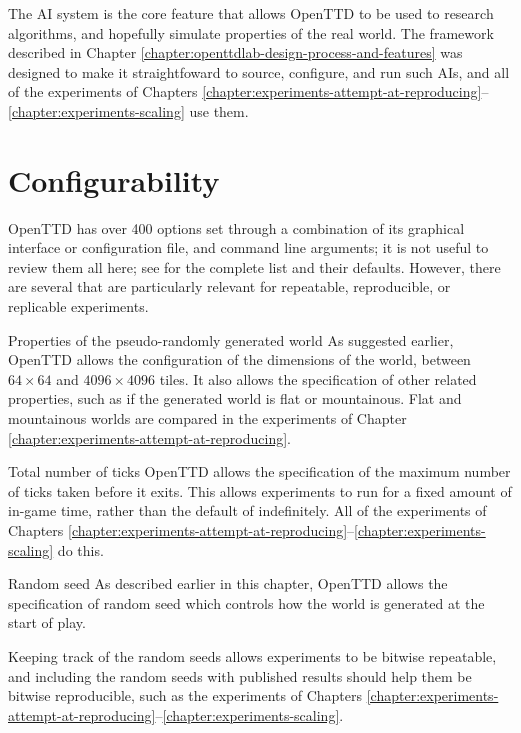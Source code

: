 \documentclass[logo,msc,dsti]{style/infthesis}    %
\begin{document}
{The AI system is the core feature that allows OpenTTD to be used to research algorithms, and hopefully simulate properties of the real world. The framework described in Chapter \ref{chapter:openttdlab-design-process-and-features} was designed to make it straightfoward to source, configure, and run such AIs, and all of the experiments of Chapters \ref{chapter:experiments-attempt-at-reproducing}--\ref{chapter:experiments-scaling} use them.

\section{Configurability}

OpenTTD has over 400 options set through a combination of its graphical interface or configuration file, and command line arguments; it is not useful to review them all here; see \cite{OpenTTDWiki} for the complete list and their defaults. However, there are several that are particularly relevant for repeatable, reproducible, or replicable experiments.

\begin{itemize}
\begin{descitem}{Properties of the pseudo-randomly generated world}
As suggested earlier, OpenTTD allows the configuration of the dimensions of the world, between $64 \times 64$ and $4096 \times 4096$ tiles. It also allows the specification of other related properties, such as if the generated world is flat or mountainous. Flat and mountainous worlds are compared in the experiments of Chapter \ref{chapter:experiments-attempt-at-reproducing}.
\end{descitem}
\begin{descitem}{Total number of ticks}
OpenTTD allows the specification of the maximum number of ticks taken before it exits. This allows experiments to run for a fixed amount of in-game time, rather than the default of indefinitely. All of the experiments of Chapters \ref{chapter:experiments-attempt-at-reproducing}--\ref{chapter:experiments-scaling} do this.
\end{descitem}
\begin{descitem}{Random seed}
As described earlier in this chapter, OpenTTD allows the specification of random seed which controls how the world is generated at the start of play.

Keeping track of the random seeds allows experiments to be bitwise repeatable, and including the random seeds with published results should help them be bitwise reproducible, such as the experiments of Chapters \ref{chapter:experiments-attempt-at-reproducing}--\ref{chapter:experiments-scaling}.
\end{descitem}


\end{itemize}}
\end{document}
